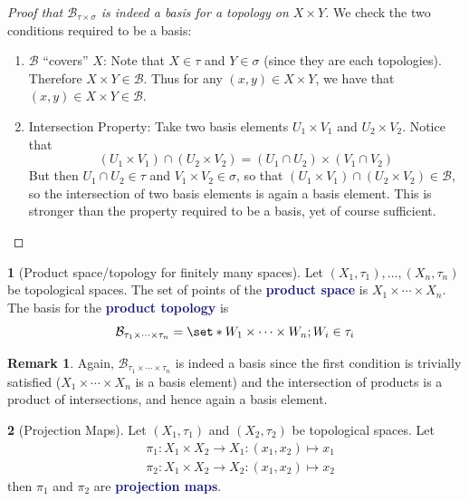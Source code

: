 \documentclass[11pt]{article}
\numberwithin{equation}{section}
\newcommand{\navy}[1]{\textcolor{MidnightBlue}{\bf #1}}
\theoremstyle{plain}
\theoremstyle{definition}
\newtheorem{definition}{\color{MidnightBlue}{\textbf{Definition}}}[section]
\newtheorem*{remark}{Remark}
\def\Set{\set*}%
\newcommand{\1}{\mathbbm 1}
\def\t{\tau}
\newcommand{\bB}{\mathcal B}
\begin{document}
\begin{proof}[Proof that $\bB_{\t \times \sigma}$ is indeed a basis for a topology on $X \times Y$]
	We check the two conditions required to be a basis:
	\begin{enumerate}
		\item $\bB$ ``covers'' $X$: Note that $X \in \t$ and $Y \in \sigma$ (since they are each topologies). Therefore $X \times Y \in \bB$. Thus for any $(x,y) \in X \times Y$, we have that $(x,y) \in X \times Y \in \bB$.
		\item Intersection Property: Take two basis elements $U_1 \times V_1$ and $U_2 \times V_2$. Notice that
		\begin{equation}
			(U_1 \times V_1) \cap (U_2 \times V_2) = (U_1 \cap U_2) \times (V_1 \cap V_2)
		\end{equation}
		But then $U_1 \cap U_2 \in \t$ and $V_1 \times V_2 \in \sigma$, so that $(U_1 \times V_1) \cap (U_2 \times V_2)  \in\bB$, so the intersection of two basis elements is again a basis element. This is stronger than the property required to be a basis, yet of course sufficient.
	\end{enumerate}
\end{proof}

\begin{definition}[Product space/topology for finitely many spaces]
	Let $(X_1,\t_1), \ldots, (X_n,\t_n)$ be topological spaces. The set of points of the \navy{product space} is $X_1 \times \cdots \times X_n$. The basis for the \navy{product topology} is
	\begin{equation}
		\bB_{\t_1 \times \cdots \times \t_n} = \Set{W_1 \times \cdots \times W_n; W_i \in \t_i}
	\end{equation}
\end{definition}

\begin{remark}
	Again, $\bB_{\t_1 \times \cdots \times \t_n}$ is indeed a basis since the first condition is trivially satisfied ($X_1 \times \cdots \times X_n$ is a basis element) and the intersection of products is a product of intersections, and hence again a basis element.
\end{remark}

\begin{definition}[Projection Maps]
	Let $(X_1,\t_1)$ and $(X_2,\t_2)$ be topological spaces. Let
	\begin{align*}
		&\pi_1:X_1 \times X_2 \to X_1 : (x_1,x_2) \mapsto x_1 \\
		&\pi_2:X_1 \times X_2 \to X_2 : (x_1,x_2) \mapsto x_2
	\end{align*}
	then $\pi_1$ and $\pi_2$ are \navy{projection maps}. 
\end{definition}
\end{document}
